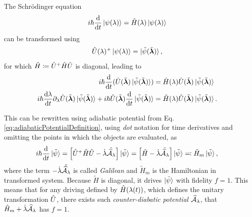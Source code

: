 The Schrödinger equation
\begin{equation}
    i\hbar \der{}{t}\ket{\psi(\lambda)} = \HH(\lambda)\ket{\psi(\lambda)}
\end{equation}
can be transformed using 
\begin{equation}
    \U(\lambda)^+  \ket{\psi(\lambda)} = \ket{\tilde\psi(\tilde\llambda)},
    \label{eq:transformationUtimeDependentH}
\end{equation}
for which $\tilde H \coloneqq\U^+\HH\U$ is diagonal, leading to
\begin{align}
    i\hbar \der{}{t}(\U(\tilde\llambda)\ket{\tilde \psi(\tilde\llambda)}) &= \HH(\lambda)\U(\tilde\llambda)\ket{\tilde \psi(\tilde\llambda)} \\
    i\hbar \der{\lambda}{t}\partial_\lambda\U(\tilde\llambda)\ket{\tilde \psi(\tilde\llambda)} + i\hbar \U(\tilde\llambda)\der{}{t}\ket{\tilde \psi(\tilde\llambda)} &= \HH(\lambda)\U(\tilde\llambda)\ket{\tilde \psi(\tilde\llambda)}.
\end{align}

This can be rewritten using adiabatic potential from Eq. \ref{eq:adiabaticPotentialDefinition}, using \emph{dot} notation for time derivatives and omitting the points in which the objects are evaluated, as
\begin{equation}
    i\hbar \der{}{t}\ket{\tilde\psi} = \left[\U^+\HH\U-\dot{\lambda}\tilde{\AA_\lambda}\right]\ket{\tilde\psi} = \left[\tilde H-\dot{\lambda}\tilde{\AA_\lambda}\right]\ket{\tilde{\psi}} \eqqcolon \tilde{H}_m \ket{\tilde{\psi}},
\end{equation}
where the term $-\dot{\lambda}\tilde{\AA_\lambda}$ is called \emph{Galilean} and $ \tilde{H}_m$ is the Hamiltonian in transformed system. Because $\tilde{H}$ is diagonal, it drives $\ket{\tilde{\psi}}$ with fidelity $f=1$. This means that for any driving defined by $\HH(\lambda(t))$, which defines the unitary transformation $\U$, there exists such \emph{counter-diabatic potential} $\AA_\lambda$, that $\HH_m + \dot{\lambda}\AA_\lambda$ has $f=1$.



